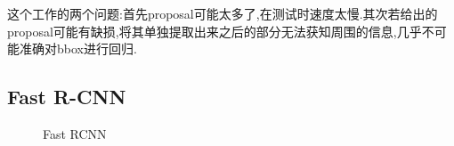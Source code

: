 这个工作的两个问题:首先proposal可能太多了,在测试时速度太慢.其次若给出的proposal可能有缺损,将其单独提取出来之后的部分无法获知周围的信息,几乎不可能准确对bbox进行回归.

\subsection{Fast R-CNN}


\begin{figure}[htbp]
    \centering
    \caption{Fast RCNN}
\end{figure}

